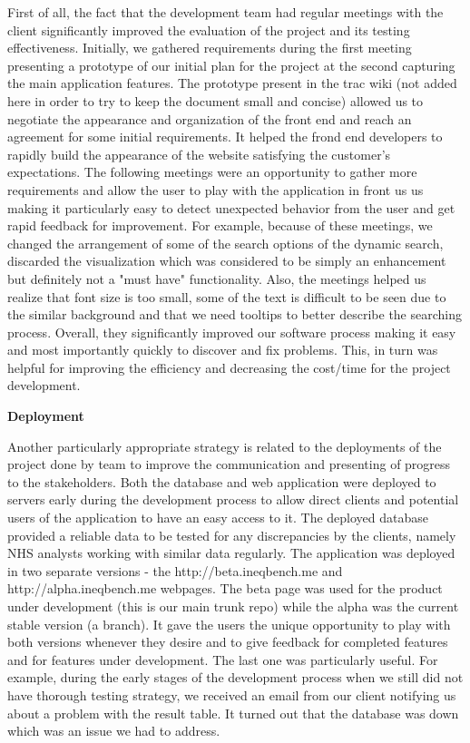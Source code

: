 \documentclass{l3proj}
\begin{document}
First of all, the fact that the development team had regular meetings with the client significantly improved the evaluation of the project and its testing effectiveness. Initially, we gathered requirements during the first meeting presenting a prototype of our initial plan for the project at the second capturing the main application features. The prototype present in the trac wiki (not added here in order to try to keep the document small and concise) allowed us to negotiate the appearance and organization of the front end and reach an agreement for some initial requirements. It helped the frond end developers to rapidly build the appearance of the website satisfying the customer's expectations. The following meetings were an opportunity to gather more requirements and allow the user to play with the application in front us us making it particularly easy to detect unexpected behavior from the user and get rapid feedback for improvement. For example, because of these meetings, we changed the arrangement of some of the search options of the dynamic search, discarded the visualization which was considered to be simply an enhancement but definitely not a "must have" functionality. Also, the meetings helped us realize that font size is too small, some of the text is difficult to be seen due to the similar background and that we need tooltips to better describe the searching process. Overall, they significantly improved our software process making it easy and most importantly quickly to discover and fix problems. This, in turn was helpful for improving the efficiency and decreasing the cost/time for the project development.

\textbf{Deployment}

Another particularly appropriate strategy is related to the deployments of the project done by team to improve the communication and presenting of progress to the stakeholders. Both the database and web application were deployed to servers early during the development process to allow direct clients and potential users of the application to have an easy access to it. The deployed database provided a reliable data to be tested for any discrepancies by the clients, namely NHS analysts working with similar data regularly. The application was deployed in two separate versions - the ​http://beta.ineqbench.me and ​http://alpha.ineqbench.me webpages. The beta page was used for the product under development (this is our main trunk repo) while the alpha was the current stable version (a branch). It gave the users the unique opportunity to play with both versions whenever they desire and to give feedback for completed features and for features under development. The last one was particularly useful. For example, during the early stages of the development process when we still did not have thorough testing strategy, we received an email from our client notifying us about a problem with the result table. It turned out that the database was down which was an issue we had to address.
\end{document}

